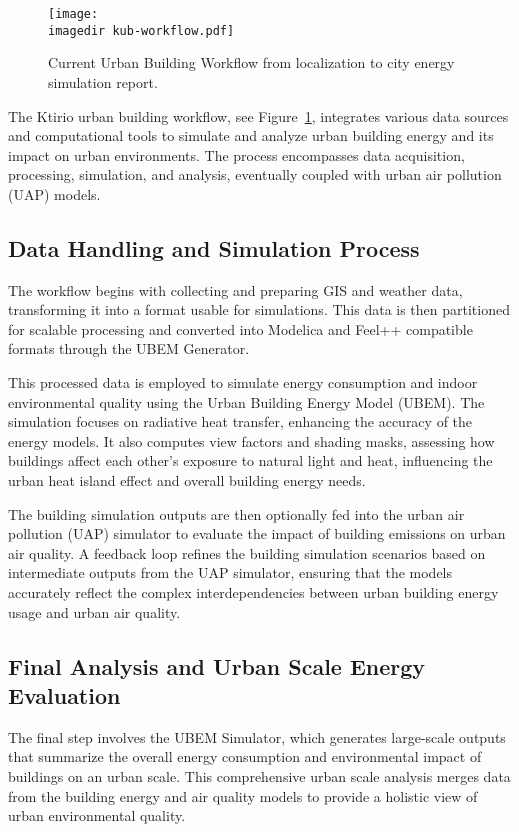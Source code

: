 \documentclass[runningheads]{llncs}
\newcommand{\imagedir}{./} %
\begin{document}
\begin{figure}
    \centering
    \texttt{[image: \\imagedir kub-workflow.pdf]}
    \caption{Current Urban Building Workflow from localization to city energy simulation report.}
    \label{fig:kub-workflow}
\end{figure}

The Ktirio urban building workflow, see Figure~\ref{fig:kub-workflow}, integrates various data sources and computational tools to simulate and analyze urban building energy and its impact on urban environments. The process encompasses data acquisition, processing, simulation, and analysis, eventually coupled with urban air pollution (UAP) models.

\subsection{Data Handling and Simulation Process}
The workflow begins with collecting and preparing GIS and weather data, transforming it into a format usable for simulations. This data is then partitioned for scalable processing and converted into Modelica and Feel++\cite{christophe_prudhomme_feelppfeelpp_2024} compatible formats through the UBEM Generator.

This processed data is employed to simulate energy consumption and indoor environmental quality using the Urban Building Energy Model (UBEM). The simulation focuses on radiative heat transfer, enhancing the accuracy of the energy models. It also computes view factors and shading masks, assessing how buildings affect each other's exposure to natural light and heat, influencing the urban heat island effect and overall building energy needs.

The building simulation outputs are then optionally fed into the urban air pollution (UAP) simulator to evaluate the impact of building emissions on urban air quality. A feedback loop refines the building simulation scenarios based on intermediate outputs from the UAP simulator, ensuring that the models accurately reflect the complex interdependencies between urban building energy usage and urban air quality.

\subsection{Final Analysis and Urban Scale Energy Evaluation}
The final step involves the UBEM Simulator, which generates large-scale outputs that summarize the overall energy consumption and environmental impact of buildings on an urban scale. This comprehensive urban scale analysis merges data from the building energy and air quality models to provide a holistic view of urban environmental quality.
\end{document}
